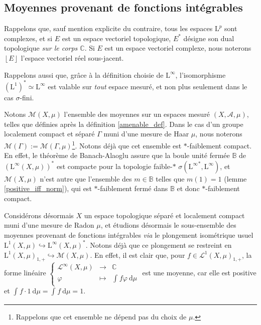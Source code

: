 \documentclass[a4paper,12pt]{article}
\newcommand{\C}{\mathbb{C}}
\newcommand{\norm}[1]{\left\Vert #1\right\Vert}
\newcommand{\floor}[1]{\left\lfloor #1 \right\rfloor}
\newcommand{\integral}[4]{\int_{#1}^{#2} #3~\mathrm{d}#4}
\newcommand\funlam[2]{\left\{\begin{array}{ccc}#1\\#2\end{array}\right.}
\newcommand{\nhds}{\mathcal{N}}
\newcommand{\TODO}[1]{}%
\begin{document}

\subsection{Moyennes provenant de fonctions intégrables}

Rappelons que, sauf mention explicite du contraire, tous les espaces $\mathrm{L}^p$ sont complexes, et
si $E$ est un espace vectoriel topologique, $E^*$ désigne son dual topologique \emph{sur le corps $\C$}. Si
$E$ est un espace vectoriel complexe, nous noterons $\floor{E}$ l'espace vectoriel réel sous-jacent.

Rappelons aussi que, grâce à la définition choisie de $\mathrm{L}^\infty$,\TODO{ref} l'isomorphisme $(\mathrm{L}^1)^* \simeq \mathrm{L}^\infty$
est valable sur \emph{tout} espace mesuré, et non plus seulement dans le cas $\sigma$-fini. \TODO{ref}

Notons $\mathcal{M}(X,\mu)$ l'ensemble des moyennes sur un espaces mesuré $(X,\mathcal{A},\mu)$, telles que définies après la définition \ref{amenable_def}.
Dans le cas d'un groupe localement compact et séparé $\Gamma$ muni d'une mesure de Haar $\mu$, nous noterons
$\mathcal{M}(\Gamma):=\mathcal{M}(\Gamma, \mu)$\footnote{Rappelons que cet ensemble ne dépend pas du choix de $\mu$.}. Notons déjà que cet ensemble est
$\ast$-faiblement compact. En effet, le théorème de Banach-Alaoglu assure que la boule unité fermée $\mathbb{B}$
de $\left(\mathrm{L}^\infty(X, \mu)\right)^*$ est compacte pour la topologie faible-$*$ $\sigma({\mathrm{L}^\infty}^*, \mathrm{L}^\infty)$,
et $\mathcal{M}(X, \mu)$ n'est autre que l'ensemble des $m\in\mathbb{B}$ telles que $m(1) = 1$ (lemme \ref{positive_iff_norm}),
qui est $*$-faiblement fermé dans $\mathbb{B}$ et donc $*$-faiblement compact.

Considérons désormais $X$ un espace topologique séparé et localement compact muni d'une mesure de Radon $\mu$, et 
étudions désormais le sous-ensemble des moyennes provenant de fonctions intégrables \emph{via} le plongement isométrique usuel $\mathrm{L}^1(X,\mu)\hookrightarrow\mathrm{L}^\infty(X,\mu)^*$.
Notons déjà que ce plongement se restreint en $\mathrm{L}^1(X, \mu)_{1, +}\hookrightarrow \mathcal{M}(X, \mu)$.
En effet, il est clair que, pour $f\in\mathscr{L}^1(X, \mu)_{1, +}$, la forme linéaire $\funlam{\mathscr{L}^\infty(X,\mu)&\to&\C}{ \varphi &\mapsto&\integral{}{}{f\varphi}{\mu}}$ est une moyenne,
car elle est positive et $\integral{}{}{f\cdot 1}{\mu} = \integral{}{}{f}{\mu} = 1$.
\end{document}
